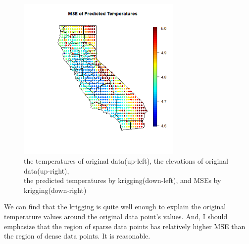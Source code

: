 \documentclass{article}
\begin{document}
\begin{figure}[!h]
    \includegraphics[height=8cm]{prob2_CAgrid_predicted_MSE.png}
    \caption{the temperatures of original data(up-left), the elevations of original data(up-right),
    \\ the predicted temperatures by krigging(down-left), and MSEs by krigging(down-right)}
\end{figure}

We can find that the krigging is quite well enough to explain the original temperature values
around the original data point's values. 
And, I should emphasize that the region of sparse data points has relatively higher MSE
than the region of dense data points. It is reasonable.
\end{document}
